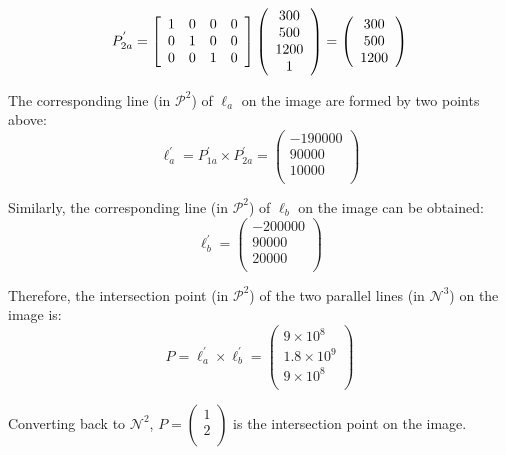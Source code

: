 \begin{questions}
\begin{parts}
\begin{solution}
  \[ P^{'}_{2a} = \left[ \begin{array} { c c c c } { 1 } & { 0 } & { 0 } & { 0 } \\ { 0 } & { 1 } & { 0 } & { 0 } \\ { 0 } & { 0 } & { 1 } & { 0 } \end{array} \right] \left( \begin{array} { c } { 300 } \\ { 500 } \\ { 1200 } \\ { 1 } \end{array} \right) = \left(\begin{array}{c}300 \\ 500 \\ 1200 \\ \end{array} \right) \]
  
  The corresponding line (in $\mathcal{P}^2$) of $\ell_{a}$ on the image are formed by two points above:
  \[ \ell^{'}_a = P^{'}_{1a} \times P^{'}_{2a} = \left(\begin{array}{c}-190000 \\ 90000 \\ 10000 \\ \end{array} \right) \]
  
  Similarly, the corresponding line (in $\mathcal{P}^2$) of $\ell_{b}$ on the image can be obtained:
  \[ \ell^{'}_b = \left(\begin{array}{c}-200000 \\ 90000 \\ 20000 \\ \end{array} \right) \]
  
  Therefore, the intersection point (in $\mathcal{P}^2$) of the two parallel lines (in $\mathcal{N}^{3}$) on the image is:
  \[ P = \ell^{'}_a \times \ell^{'}_b  = \left(\begin{array}{c} 9 \times 10^{8} \\ 1.8 \times 10^{9} \\ 9 \times 10^{8} \\ \end{array} \right) \]
  
  Converting back to $\mathcal{N}^{2}$, $P = \left(\begin{array}{c} 1 \\ 2 \\ \end{array} \right)$ is the intersection point on the image.
  

\end{solution}
\end{parts}
\end{questions}
